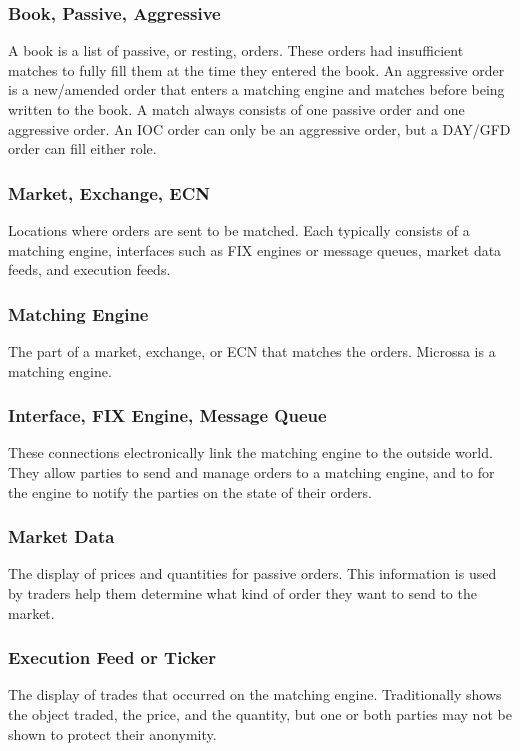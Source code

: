 \documentclass[Letter]{article}
\begin{document}
\subsubsection{Book, Passive, Aggressive}

A book is a list of passive, or resting, orders.  These orders had
insufficient matches to fully fill them at the time they entered the book.
An aggressive order is a new/amended order that enters a matching engine
and matches before being written to the book.  A match always consists
of one passive order and one aggressive order.  An IOC order can only
be an aggressive order, but a DAY/GFD order can fill either role.

\subsubsection{Market, Exchange, ECN}

Locations where orders are sent to be matched.  Each typically consists
of a matching engine, interfaces such as FIX engines or message queues,
market data feeds, and execution feeds.

\subsubsection{Matching Engine}

The part of a market, exchange, or ECN that matches the orders.
Microssa is a matching engine.

\subsubsection{Interface, FIX Engine, Message Queue}

These connections electronically link the matching engine to the outside
world.  They allow parties to send and manage orders to a matching
engine, and to for the engine to notify the parties on the state of
their orders.

\subsubsection{Market Data}
The display of prices and quantities for passive orders.  This
information is used by traders help them determine what kind of order
they want to send to the market.

\subsubsection{Execution Feed or Ticker}
The display of trades that occurred on the matching engine.
Traditionally shows the object traded, the price, and the quantity,
but one or both parties may not be shown to protect their anonymity.
\end{document}
